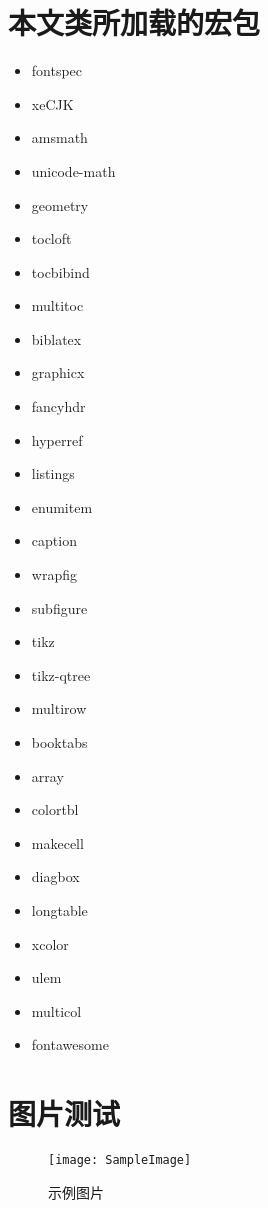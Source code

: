 \section{本文类所加载的宏包}
\begin{multicols}{4}
    \begin{itemize}
        \item fontspec
        \item xeCJK
        \item amsmath
        \item unicode-math
        \item geometry
        \item tocloft
        \item tocbibind
        \item multitoc
        \item biblatex
        \item graphicx
        \item fancyhdr
        \item hyperref
        \item listings
        \item enumitem
        \item caption
        \item wrapfig
        \item subfigure
        \item tikz
        \item tikz-qtree
        \item multirow
        \item booktabs
        \item array
        \item colortbl
        \item makecell
        \item diagbox
        \item longtable
        \item xcolor
        \item ulem
        \item multicol
        \item fontawesome
    \end{itemize}
\end{multicols}

\section{图片测试}
\sampletext

\begin{figure}[h!]
    \centering
    \texttt{[image: SampleImage]}
    \caption{示例图片}
\end{figure}

